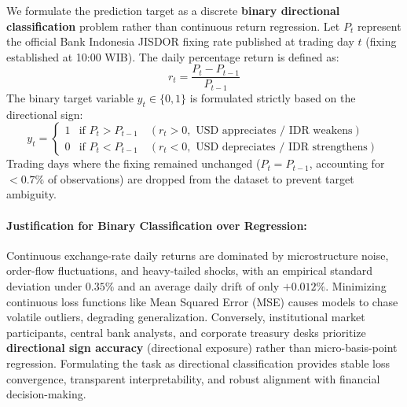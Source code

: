 \documentclass[10pt,a4paper]{article}
\begin{document}
We formulate the prediction target as a discrete \textbf{binary directional classification} problem rather than continuous return regression. Let $P_t$ represent the official Bank Indonesia JISDOR fixing rate published at trading day $t$ (fixing established at 10:00 WIB). The daily percentage return is defined as:
\begin{equation}
    r_t = \frac{P_t - P_{t-1}}{P_{t-1}}
\end{equation}
The binary target variable $y_t \in \{0, 1\}$ is formulated strictly based on the directional sign:
\begin{equation}
    y_t = \begin{cases}
        1 & \text{if } P_t > P_{t-1} \quad (r_t > 0, \text{ USD appreciates / IDR weakens}) \\
        0 & \text{if } P_t < P_{t-1} \quad (r_t < 0, \text{ USD depreciates / IDR strengthens})
    \end{cases}
\end{equation}
Trading days where the fixing remained unchanged ($P_t = P_{t-1}$, accounting for $<0.7\%$ of observations) are dropped from the dataset to prevent target ambiguity.

\paragraph{Justification for Binary Classification over Regression:}
Continuous exchange-rate daily returns are dominated by microstructure noise, order-flow fluctuations, and heavy-tailed shocks, with an empirical standard deviation under $0.35\%$ and an average daily drift of only $+0.012\%$. Minimizing continuous loss functions like Mean Squared Error (MSE) causes models to chase volatile outliers, degrading generalization. Conversely, institutional market participants, central bank analysts, and corporate treasury desks prioritize \textbf{directional sign accuracy} (directional exposure) rather than micro-basis-point regression. Formulating the task as directional classification provides stable loss convergence, transparent interpretability, and robust alignment with financial decision-making.
\end{document}
